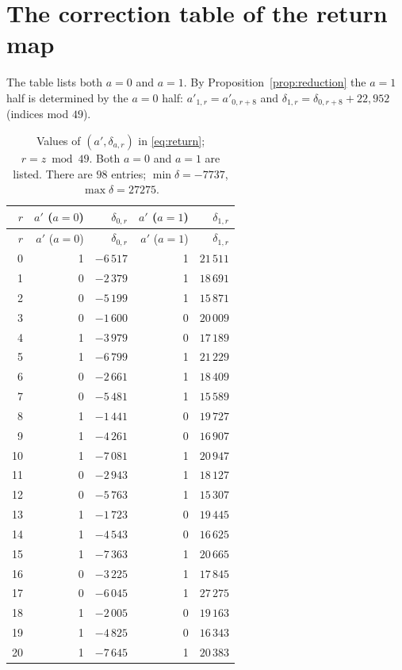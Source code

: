 \documentclass[11pt,a4paper]{article}
\theoremstyle{definition}
\begin{document}
\section{The correction table of the return map}
The table lists both $a=0$ and $a=1$. By Proposition~\ref{prop:reduction} the $a=1$ half is determined by the $a=0$ half: $a'_{1,r}=a'_{0,r+8}$ and $\delta_{1,r}=\delta_{0,r+8}+22{,}952$ (indices mod $49$).
\begin{longtable}{@{}rrrrr@{}}
\caption{Values of $(a',\delta_{a,r})$ in \eqref{eq:return}; $r=z \bmod 49$. Both $a=0$ and $a=1$ are listed. There are $98$ entries; $\min\delta=-7737$, $\max\delta=27275$.}\label{tab:returnmap}\\
\toprule
$r$ & $a'$ ($a=0$) & $\delta_{0,r}$ & $a'$ ($a=1$) & $\delta_{1,r}$\\
\midrule
\endfirsthead
\toprule
$r$ & $a'$ ($a=0$) & $\delta_{0,r}$ & $a'$ ($a=1$) & $\delta_{1,r}$\\
\midrule
\endhead
0 & 1 & $-6\,517$ & 1 & $21\,511$ \\
1 & 0 & $-2\,379$ & 1 & $18\,691$ \\
2 & 0 & $-5\,199$ & 1 & $15\,871$ \\
3 & 0 & $-1\,600$ & 0 & $20\,009$ \\
4 & 1 & $-3\,979$ & 0 & $17\,189$ \\
5 & 1 & $-6\,799$ & 1 & $21\,229$ \\
6 & 0 & $-2\,661$ & 1 & $18\,409$ \\
7 & 0 & $-5\,481$ & 1 & $15\,589$ \\
8 & 1 & $-1\,441$ & 0 & $19\,727$ \\
9 & 1 & $-4\,261$ & 0 & $16\,907$ \\
10 & 1 & $-7\,081$ & 1 & $20\,947$ \\
11 & 0 & $-2\,943$ & 1 & $18\,127$ \\
12 & 0 & $-5\,763$ & 1 & $15\,307$ \\
13 & 1 & $-1\,723$ & 0 & $19\,445$ \\
14 & 1 & $-4\,543$ & 0 & $16\,625$ \\
15 & 1 & $-7\,363$ & 1 & $20\,665$ \\
16 & 0 & $-3\,225$ & 1 & $17\,845$ \\
17 & 0 & $-6\,045$ & 1 & $27\,275$ \\
18 & 1 & $-2\,005$ & 0 & $19\,163$ \\
19 & 1 & $-4\,825$ & 0 & $16\,343$ \\
20 & 1 & $-7\,645$ & 1 & $20\,383$ \\

\end{longtable}
\end{document}
